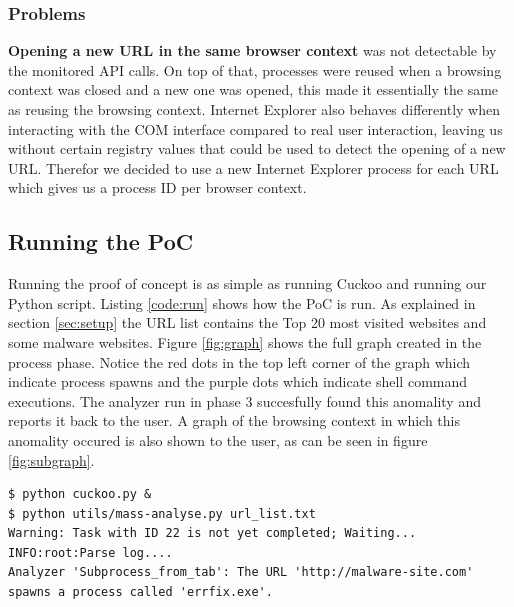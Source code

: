 \subsubsection{Problems}

\textbf{Opening a new URL in the same browser context} was not detectable by the monitored API calls. On top of that, processes were reused when a browsing context was closed and a new one was opened, this made it essentially the same as reusing the browsing context. Internet Explorer also behaves differently when interacting with the COM interface compared to real user interaction, leaving us without certain registry values that could be used to detect the opening of a new URL. Therefor we decided to use a new Internet Explorer process for each URL which gives us a process ID per browser context.

\subsection{Running the PoC}

Running the proof of concept is as simple as running Cuckoo and running our Python script. Listing \ref{code:run} shows how the PoC is run. As explained in section \ref{sec:setup} the URL list contains the Top 20 most visited websites and some malware websites. Figure \ref{fig:graph} shows the full graph created in the process phase. Notice the red dots in the top left corner of the graph which indicate process spawns and the purple dots which indicate shell command executions. The analyzer run in phase 3 succesfully found this anomality and reports it back to the user. A graph of the browsing context in which this anomality occured is also shown to the user, as can be seen in figure \ref{fig:subgraph}.

\begin{lstlisting}[caption={Amazing},label={code:run}]
$ python cuckoo.py &
$ python utils/mass-analyse.py url_list.txt
Warning: Task with ID 22 is not yet completed; Waiting...
INFO:root:Parse log....
Analyzer 'Subprocess_from_tab': The URL 'http://malware-site.com' spawns a process called 'errfix.exe'.
\end{lstlisting}

